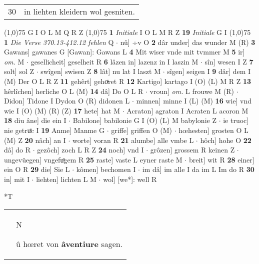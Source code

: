 \documentclass[8pt,a4paper,notitlepage]{article}
\begin{document}
\begin{table}[ht]
\begin{minipage}[t]{0.5\linewidth}
\begin{tabular}{rl}
30 & in liehten kleidern wol gesniten.\\ 
\end{tabular}
\scriptsize
\line(1,0){75} \newline
G I O L M Q R Z \newline
\line(1,0){75} \newline
\textbf{1} \textit{Initiale} I O L M R Z  \textbf{19} \textit{Initiale} G I  \newline
\line(1,0){75} \newline
\textbf{1} \textit{Die Verse 370.13-412.12 fehlen} Q   $\cdot$ nû] ÷v O \textbf{2} dâr under] das wunder M (R) \textbf{3} Gawans] gawanes G [Gawan]: Gawans L \textbf{4} Mit wiser vnde mit tvmmer M \textbf{5} ir] \textit{om.} M  $\cdot$ gesellicheit] geselheit R \textbf{6} lâzen in] lazenz in I laszin M  $\cdot$ sîn] wesen I Z \textbf{7} solt] sol Z  $\cdot$ swîgen] swisen Z \textbf{8} lât] nu lat I laszt M  $\cdot$ sîgen] seigen I \textbf{9} dâr] dem I (M) Der O L R Z \textbf{11} gehêrt] gehoͯret R \textbf{12} Kartigo] kartago I (O) (L) M R Z \textbf{13} hêrlîchen] herliche O L (M) \textbf{14} dâ] Do O L R  $\cdot$ vroun] \textit{om.} L frouwe M (R)  $\cdot$ Didon] Tidone I Dydon O (R) didonen L  $\cdot$ minnen] minne I (L) (M) \textbf{16} wie] vnd wie I (O) (M) (R) (Z) \textbf{17} hete] hat M  $\cdot$ Acraton] agraton I Acraten L acoron M \textbf{18} diu âne] die ein I  $\cdot$ Babilone] babilonie G I (O) (L) M babylonie Z  $\cdot$ ie truoc] nie getruͤc I \textbf{19} Anme] Manme G  $\cdot$ griffe] griffen O (M)  $\cdot$ hœhesten] grosten O L (M) Z \textbf{20} nâch] an I  $\cdot$ worte] voran R \textbf{21} alumbe] alle vmbe L  $\cdot$ hôch] hohe O \textbf{22} dâ] do R  $\cdot$ gezôch] zoch L R Z \textbf{24} noch] vnd I  $\cdot$ grôzen] grossem R keinen Z  $\cdot$ ungevüegen] vngefuͦgem R \textbf{25} raste] vaste L eyner raste M  $\cdot$ breit] wit R \textbf{28} einer] ein O R \textbf{29} die] Sie L  $\cdot$ kômen] bechomen I  $\cdot$ im dâ] im alle I da im L Im do R \textbf{30} in] mit I  $\cdot$ liehten] lichten L M  $\cdot$ wol] [we*]: well R \newline
\end{minipage}
\hspace{0.5cm}
\begin{minipage}[t]{0.5\linewidth}
\small
\begin{center}*T
\end{center}
\begin{tabular}{rl}
 & \begin{large}N\end{large}û hœret von \textbf{âventiure} sagen.\\ 

\end{tabular}
\end{minipage}
\end{table}
\end{document}

